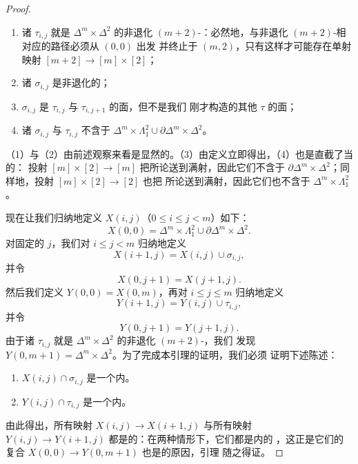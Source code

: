 \begin{proof}
\begin{enumerate}[label=(\arabic*)]
  \item 诸\trSimplex{} $\tau_{i,j}$ 就是 $\Delta^m \times \Delta^2$ 的非退化
  $(m+2)$-\trSimplex{}：必然地，与非退化 $(m+2)$-\trSimplex{}相对应的路径必须从 $(0, 0)$ 出发
  并终止于 $(m, 2)$，只有这样才可能存在单射映射 $[m+2] \to [m] \times [2]$；
  \item 诸\trSimplex{} $\sigma_{i,j}$ 是非退化的；
  \item \trSimplex{} $\sigma_{i,j}$ 是 $\tau_{i,j}$ 与 $\tau_{i,j+1}$ 的面，但不是我们
  刚才构造的其他 $\tau$ 的面；
  \item 诸\trSimplex{} $\sigma_{i,j}$ 与 $\tau_{i,j}$ 不含于
  $\Delta^m \times \Lambda^2_1 \cup \partial\Delta^m \times \Delta^2$。
\end{enumerate}
（1）与（2）由前述观察来看是显然的。（3）由定义立即得出，（4）也是直截了当的：
投射 $[m] \times [2] \to [m]$ 把所论\trSimplex{}送到满射，因此它们不含于
$\partial\Delta^m \times \Delta^2$；同样地，投射 $[m] \times [2] \to [2]$ 也把
所论\trSimplex{}送到满射，因此它们也不含于 $\Delta^m \times \Lambda^2_1$。

现在让我们归纳地定义\trSimplicialSet{} $X(i, j)$（$0 \le i \le j < m$）如下：
\[
X(0, 0) = \Delta^m \times \Lambda^2_1 \cup \partial\Delta^m \times \Delta^2.
\]
对固定的 $j$，我们对 $i \le j < m$ 归纳地定义
\[
X(i + 1, j) = X(i, j) \cup \sigma_{i,j},
\]
并令
\[
X(0, j + 1) = X(j + 1, j).
\]
然后我们定义 $Y(0, 0) = X(0, m)$，再对 $i \le j \le m$ 归纳地定义
\[
Y(i + 1, j) = Y(i, j) \cup \tau_{i,j},
\]
并令
\[
Y(0, j + 1) = Y(j + 1, j).
\]
由于诸 $\tau_{i,j}$ 就是 $\Delta^m \times \Delta^2$ 的非退化 $(m+2)$-\trSimplex{}，我们
发现 $Y(0, m + 1) = \Delta^m \times \Delta^2$。为了完成本引理的证明，我们必须
证明下述陈述：
\begin{enumerate}[label=(\Alph*)]
  \item \trSimplicialSet{} $X(i, j) \cap \sigma_{i,j}$ 是一个内\trHorn{}。
  \item \trSimplicialSet{} $Y(i, j) \cap \tau_{i,j}$ 是一个内\trHorn{}。
\end{enumerate}
由此得出，所有映射 $X(i, j) \to X(i + 1, j)$ 与所有映射
$Y(i, j) \to Y(i + 1, j)$ 都是\trInnerAnodyne{}的：在两种情形下，它们都是内\trHornInclusion{}的%
\trPushout{}，这正是它们的复合 $X(0, 0) \to Y(0, m+1)$ 也是\trInnerAnodyne{}的原因，引理
随之得证。


\end{proof}
